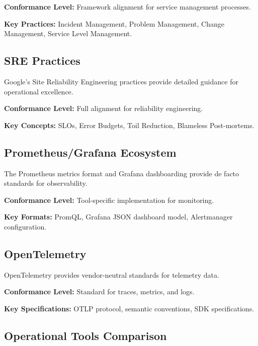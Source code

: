 \documentclass[11pt,letterpaper]{article}
\begin{document}
\textbf{Conformance Level:} Framework alignment for service management processes.

\textbf{Key Practices:} Incident Management, Problem Management, Change Management, Service Level Management.

\subsection{SRE Practices}

Google's Site Reliability Engineering practices provide detailed guidance for operational excellence.

\textbf{Conformance Level:} Full alignment for reliability engineering.

\textbf{Key Concepts:} SLOs, Error Budgets, Toil Reduction, Blameless Post-mortems.

\subsection{Prometheus/Grafana Ecosystem}

The Prometheus metrics format and Grafana dashboarding provide de facto standards for observability.

\textbf{Conformance Level:} Tool-specific implementation for monitoring.

\textbf{Key Formats:} PromQL, Grafana JSON dashboard model, Alertmanager configuration.

\subsection{OpenTelemetry}

OpenTelemetry provides vendor-neutral standards for telemetry data.

\textbf{Conformance Level:} Standard for traces, metrics, and logs.

\textbf{Key Specifications:} OTLP protocol, semantic conventions, SDK specifications.

\subsection{Operational Tools Comparison}
\end{document}
